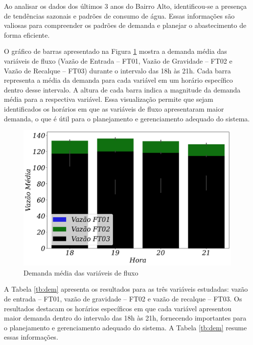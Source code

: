 Ao analisar os dados dos últimos 3 anos do Bairro Alto, identificou-se a presença de tendências sazonais e padrões de consumo de água. Essas informações são valiosas para compreender os padrões de demanda e planejar o abastecimento de forma eficiente.


O gráfico de barras apresentado na Figura \ref{fig:grafico-barras-demanda} mostra a demanda média das variáveis de fluxo (Vazão de Entrada -- FT01, Vazão de Gravidade -- FT02 e Vazão de Recalque -- FT03) durante o intervalo das 18h às 21h. Cada barra representa a média da demanda para cada variável em um horário específico dentro desse intervalo. A altura de cada barra indica a magnitude da demanda média para a respectiva variável. Essa visualização permite que sejam identificados os horários em que as variáveis de fluxo apresentaram maior demanda, o que é útil para o planejamento e gerenciamento adequado do sistema.

\begin{figure}[!htb]
	\centering
	\caption{Demanda média das variáveis de fluxo}
	\includegraphics[width=0.7\linewidth]{Resultados/Figuras/grafico-barras-demanda}
	
	\label{fig:grafico-barras-demanda}
	
	
\end{figure}

A Tabela \ref{tb:dem} apresenta os resultados para as três variáveis estudadas: vazão de entrada -- FT01, vazão de gravidade -- FT02 e vazão de recalque -- FT03.
Os resultados destacam os horários específicos em que cada variável apresentou maior demanda dentro do intervalo das 18h às 21h, fornecendo importantes para o planejamento e gerenciamento adequado do sistema. A Tabela \ref{tb:dem} resume essas informações.



